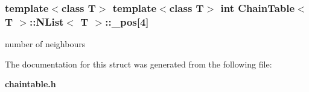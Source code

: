 \subsubsection{\setlength{\rightskip}{0pt plus 5cm}template$<$class T$>$ template$<$class T$>$ int {\bf Chain\-Table}$<$ T $>$::{\bf NList}$<$ T $>$::{\bf \_\-pos}[4]}\label{structChainTable_1_1NList_o1}


number of neighbours 



The documentation for this struct was generated from the following file:\begin{CompactItemize}
\item 
{\bf chaintable.h}\end{CompactItemize}
